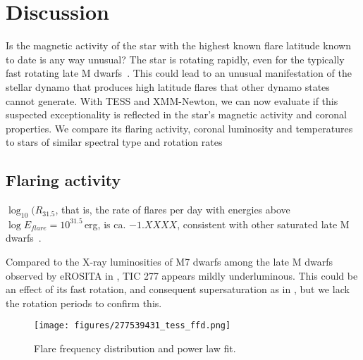\documentclass[twocolumn]{aastex631}
\begin{document}
\section{Discussion}
\label{sec:discussion}

Is the magnetic activity of the star with the highest known flare latitude known to date is any way unusual? The star is rotating rapidly, even for the typically fast rotating late M dwarfs~\citep{medina2022galactic}. This could lead to an unusual manifestation of the stellar dynamo that produces high latitude flares that other dynamo states cannot generate. With TESS and XMM-Newton, we can now evaluate if this suspected exceptionality is reflected in the star's magnetic activity and coronal properties. We compare its flaring activity, coronal luminosity and temperatures to stars of similar spectral type and rotation rates

\subsection{Flaring activity}
\label{sec:discussion:flares}

$\log_10(R_{31.5}$, that is, the rate of flares per day with energies above $\log E_{flare}=10^{31.5}\,$erg, is ca. $-1.XXXX$, consistent with other saturated late M dwarfs~\citep{medina2022galactic}.

Compared to the X-ray luminosities of M7 dwarfs among the late M dwarfs observed by eROSITA in \citet{stelzer2022first}, TIC 277 appears mildly underluminous. This could be an effect of its fast rotation, and consequent supersaturation as in \citet{magaudda2022first}, but we lack the rotation periods to confirm this. 

\begin{figure}
    \begin{centering}
        \texttt{[image: figures/277539431\_tess\_ffd.png]}
        \caption{
         Flare frequency distribution and power law fit.
        }
        \label{fig:ffd}
    \end{centering}
\end{figure}


\end{document}
